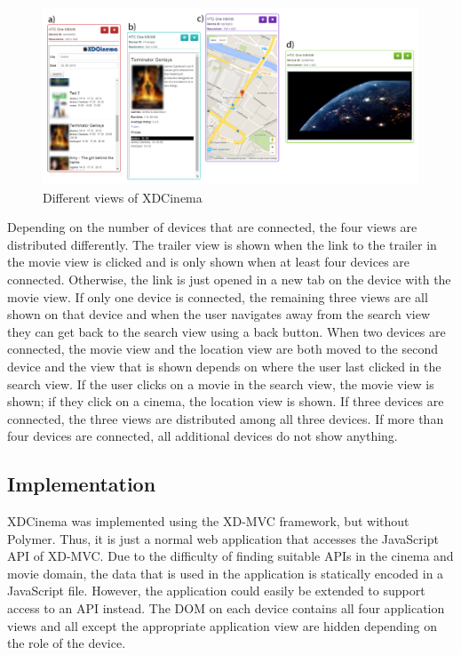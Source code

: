 \begin{figure}[H]
  \centering
    \includegraphics[width=1.0\textwidth]{images/screenshots/xdcinema_3_labeled_2.png}
	\caption[Screenshot XDCinema: Different views]{Different views of XDCinema}
	\label{fig:xdcinema}
\end{figure}

Depending on the number of devices that are connected, the four views are distributed differently. The trailer view is shown when the link to the trailer in the movie view is clicked and is only shown when at least four devices are connected. Otherwise, the link is just opened in a new tab on the device with the movie view. If only one device is connected, the remaining three views are all shown on that device and when the user navigates away from the search view they can get back to the search view using a back button. When two devices are connected, the movie view and the location view are both moved to the second device and the view that is shown depends on where the user last clicked in the search view. If the user clicks on a movie in the search view, the movie view is shown; if they click on a cinema, the location view is shown. If three devices are connected, the three views are distributed among all three devices. If more than four devices are connected, all additional devices do not show anything.

\subsection{Implementation}

XDCinema was implemented using the XD-MVC framework, but without Polymer. Thus, it is just a normal web application that accesses the JavaScript API of XD-MVC. Due to the difficulty of finding suitable APIs in the cinema and movie domain, the data that is used in the application is statically encoded in a JavaScript file. However, the application could easily be extended to support access to an API instead. The DOM on each device contains all four application views and all except the appropriate application view are hidden depending on the role of the device. 

